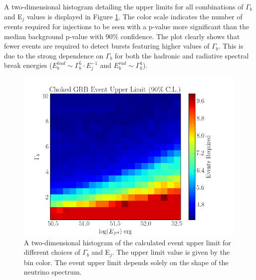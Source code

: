 \documentclass{gatech-thesis}
\begin{document}
A two-dimensional histogram detailing the upper limits for all combinations of $\Gamma_b$ and E$_j$ values is displayed in Figure \ref{fig:ParameterDep_UL}. The color scale indicates the number of events required for injections to be seen with a p-value more significant than the median background p-value with 90$\%$ confidence. The plot clearly shows that fewer events are required to detect bursts featuring higher values of $\Gamma_b$. This is due to the strong dependence on $\Gamma_b$ for both the hadronic and radiative spectral break energies ($E_{b}^{had} \sim \Gamma_b^{5} \cdot E_j^{-1}$ and $E_{b}^{rad} \sim \Gamma_b^{1}$).
\begin{figure}[ht]
  \begin{center}
    \includegraphics[width=1.0\textwidth,keepaspectratio]{UpperLimit_2DHisto_SysAdj.png}
  \end{center}
  \caption[Choked GRB Parameter Dependent Upper Limit]{A two-dimensional histogram of the calculated event upper limit for different choices of $\Gamma_b$ and E$_j$. The upper limit value is given by the bin color. The event upper limit depends solely on the shape of the neutrino spectrum.}
  \label{fig:ParameterDep_UL}
\end{figure}
\end{document}
